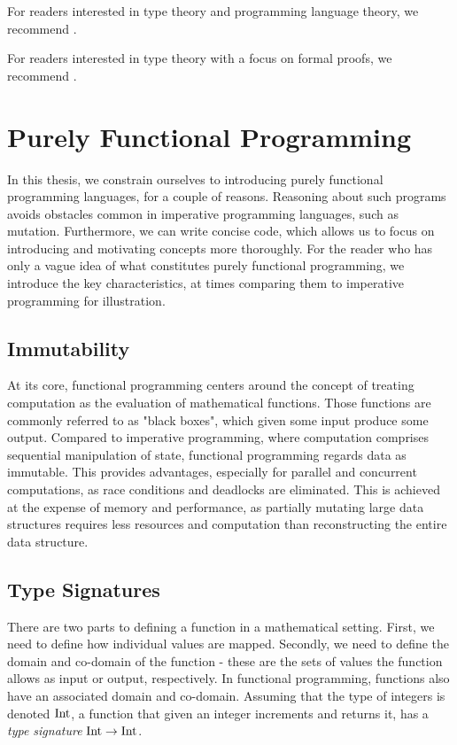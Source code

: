 For readers interested in type theory and programming language theory, we recommend \cite{pierce_types_2002}.

For readers interested in type theory with a focus on formal proofs, we recommend \cite{nederpelt_type_2014}.

\section{Purely Functional Programming}

In this thesis, we constrain ourselves to introducing purely functional programming languages, for a couple of reasons. Reasoning about such programs avoids obstacles common in imperative programming languages, such as mutation. Furthermore, we can write concise code, which allows us to focus on introducing and motivating concepts more thoroughly. For the reader who has only a vague idea of what constitutes purely functional programming, we introduce the key characteristics, at times comparing them to imperative programming for illustration.

\subsection{Immutability}

At its core, functional programming centers around the concept of treating computation as the evaluation of mathematical functions. Those functions are commonly referred to as "black boxes", which given some input produce some output. Compared to imperative programming, where computation comprises sequential manipulation of state, functional programming regards data as immutable. This provides advantages, especially for parallel and concurrent computations, as race conditions and deadlocks are eliminated. This is achieved at the expense of memory and performance, as partially mutating large data structures requires less resources and computation than reconstructing the entire data structure.

\subsection{Type Signatures}

There are two parts to defining a function in a mathematical setting. First, we need to define how individual values are mapped. Secondly, we need to define the domain and co-domain of the function - these are the sets of values the function allows as input or output, respectively. In functional programming, functions also have an associated domain and co-domain. Assuming that the type of integers is denoted \(\text{Int}\), a function that given an integer increments and returns it, has a \emph{type signature} \(\text{Int} \to \text{Int}\).  

